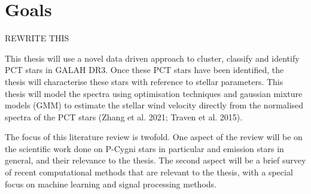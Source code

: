 \section{Goals}

REWRITE THIS

This thesis will use a novel data driven approach to cluster, classify and identify PCT stars in GALAH DR3. Once these PCT stars have been identified, the thesis will characterise these stars with reference to stellar parameters. This thesis will model the spectra using optimisation techniques and gaussian mixture models (GMM) to estimate the stellar wind velocity directly from the normalised spectra of the PCT stars (Zhang et al. 2021; Traven et al. 2015).

The focus of this literature review is twofold. One aspect of the review will be on the scientific work done on P-Cygni stars in particular and emission stars in general, and their relevance to the thesis. The second aspect will be a brief survey of recent computational methods that are relevant to the thesis, with a special focus on machine learning and signal processing methods. 



